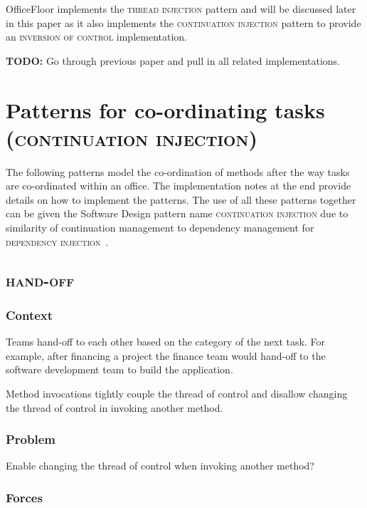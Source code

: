 \documentclass[prodmode]{style/acmlarge}
\begin{document}
OfficeFloor \cite{officefloor} implements the \textsc{thread injection} pattern
and will be discussed later in this paper as it also implements the
\textsc{continuation injection} pattern to provide an \textsc{inversion of control}
implementation.

\textbf{TODO:} Go through previous paper and pull in all related implementations. 




\section{Patterns for co-ordinating tasks (\textsc{continuation injection})}

The following patterns model the co-ordination of methods after the way tasks
are co-ordinated within an office.  The implementation notes at the end provide
details on how to implement the patterns.  The use of all these patterns
together can be given the Software Design pattern name \textsc{continuation
injection} due to similarity of continuation management to dependency management
for \textsc{dependency injection}~\cite{ioc}.


\subsection{\textsc{\textbf{hand-off}}}

\subsubsection*{Context}

Teams hand-off to each other based on the category of the next task.  For
example, after financing a project the finance team would hand-off to the
software development team to build the application.

Method invocations tightly couple the thread of control and disallow changing
the thread of control in invoking another method.

\subsubsection*{Problem}

Enable changing the thread of control when invoking another method?

\subsubsection*{Forces}
\end{document}
